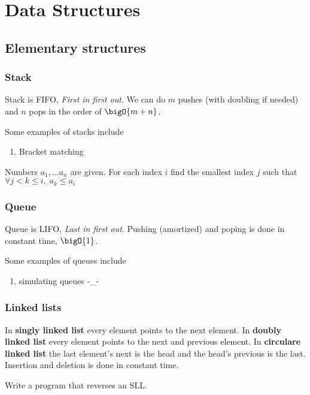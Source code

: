 \chapter{Data Structures}
\section{Elementary structures}
\subsection{Stack}
Stack is FIFO, \textit{First in first out}. We can do \(m\) pushes (with doubling if needed) and \(n\) pops in the order of \(\bigO{m + n}\).
\begin{example}
    Some examples of stacks include
    \begin{enumerate}
        \item Bracket matching
    \end{enumerate}
\end{example}

\begin{example}
    Numbers \(a_1 , \dots a_n\) are given. For each index \(i\) find the smallest index \(j\) such that \(\forall j < k \leq i, \; a_k \leq a_i\)
\end{example}

\subsection{Queue}
Queue is LIFO, \textit{Last in first out}.
Pushing (amortized) and poping is done in constant time, \(\bigO{1}\).
\begin{example}
    Some examples of queues include
    \begin{enumerate}
        \item simulating queues -\_-
    \end{enumerate}
\end{example}

\subsection{Linked lists}
In \textbf{singly linked list} every element points to the next element. In \textbf{doubly linked list} every element points to the next and previous element. In \textbf{circulare linked list} the last element's next is the head and the head's previous is the last. Insertion and deletion is done in constant time.

\begin{example}
    Write a program that reverses an SLL.
\end{example}


